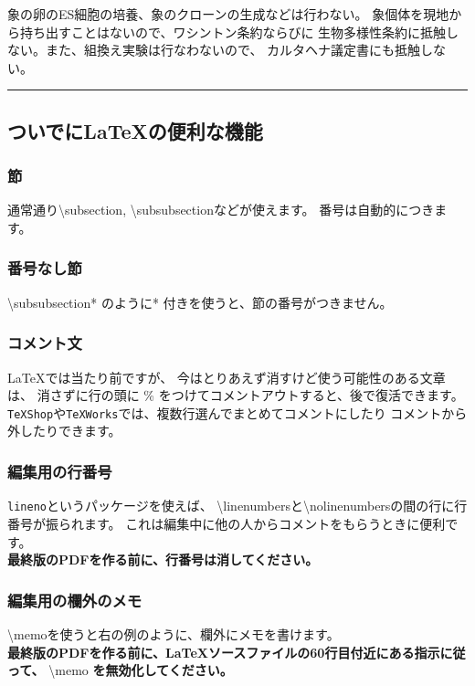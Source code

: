 \documentclass[11pt,a4paper,uplatex,dvipdfmx]{ujarticle} 		%
\newcommand{\研究課題名}{象の卵}
\newcommand{\研究機関名}{逢坂大学}
\newcommand{\研究代表者氏名}{湯川秀樹}
\newcommand{\memo}[1]{\marginpar{#1}}
\begin{document}
	象の卵のES細胞の培養、象のクローンの生成などは行わない。
	象個体を現地から持ち出すことはないので、ワシントン条約ならびに
        生物多様性条約に抵触しない。また、組換え実験は行なわないので、
        カルタヘナ議定書にも抵触しない。

        \noindent
        \rule{\linewidth}{1pt}
        \linenumbers
        \subsection{ついでに\LaTeX の便利な機能}
        \subsubsection{節}
        通常通り\textbackslash subsection, \textbackslash subsubsectionなどが使えます。
        番号は自動的につきます。
        
        \subsubsection*{番号なし節}
        \textbackslash subsubsection* のように* 付きを使うと、節の番号がつきません。
        
        \subsubsection{コメント文}
        \LaTeX では当たり前ですが、
        今はとりあえず消すけど使う可能性のある文章は、
        消さずに行の頭に \% をつけてコメントアウトすると、後で復活できます。
        \texttt{TeXShop}や\texttt{TeXWorks}では、複数行選んでまとめてコメントにしたり
        コメントから外したりできます。
        
        \subsubsection{編集用の行番号}
        \texttt{lineno}というパッケージを使えば、
        \textbackslash linenumbersと\textbackslash nolinenumbersの間の行に行番号が振られます。
        これは編集中に他の人からコメントをもらうときに便利です。\\
        \textbf{最終版のPDFを作る前に、行番号は消してください。}
        
        \subsubsection{編集用の欄外のメモ}
        \textbackslash memo{}を使うと右の例のように、欄外にメモを書けます。\\
        \memo{欄外メモ\\だよ}
        \textbf{最終版のPDFを作る前に、\LaTeX ソースファイルの60行目付近にある指示に従って、}
        \textbackslash memo \textbf{を無効化してください。}
        
\end{document}
